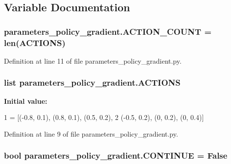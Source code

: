 \subsection{Variable Documentation}
\subsubsection[{\texorpdfstring{A\+C\+T\+I\+O\+N\+\_\+\+C\+O\+U\+NT}{ACTION_COUNT}}]{\setlength{\rightskip}{0pt plus 5cm}parameters\+\_\+policy\+\_\+gradient.\+A\+C\+T\+I\+O\+N\+\_\+\+C\+O\+U\+NT = len({\bf A\+C\+T\+I\+O\+NS})}\hypertarget{namespaceparameters__policy__gradient_a96a0f11e2c0420498ae8bec147f751e2}{}\label{namespaceparameters__policy__gradient_a96a0f11e2c0420498ae8bec147f751e2}


Definition at line 11 of file parameters\+\_\+policy\+\_\+gradient.\+py.

\subsubsection[{\texorpdfstring{A\+C\+T\+I\+O\+NS}{ACTIONS}}]{\setlength{\rightskip}{0pt plus 5cm}list parameters\+\_\+policy\+\_\+gradient.\+A\+C\+T\+I\+O\+NS}\hypertarget{namespaceparameters__policy__gradient_a14a6aa5c85bbb1f0a5eebce843788071}{}\label{namespaceparameters__policy__gradient_a14a6aa5c85bbb1f0a5eebce843788071}
{\bfseries Initial value\+:}
\begin{DoxyCode}
1 = [(-0.8, 0.1), (0.8, 0.1), (0.5, 0.2),
2            (-0.5, 0.2), (0, 0.2), (0, 0.4)]
\end{DoxyCode}


Definition at line 9 of file parameters\+\_\+policy\+\_\+gradient.\+py.

\subsubsection[{\texorpdfstring{C\+O\+N\+T\+I\+N\+UE}{CONTINUE}}]{\setlength{\rightskip}{0pt plus 5cm}bool parameters\+\_\+policy\+\_\+gradient.\+C\+O\+N\+T\+I\+N\+UE = False}\hypertarget{namespaceparameters__policy__gradient_a1dfc560f0fb66eabf7e4a49aec538e18}{}\label{namespaceparameters__policy__gradient_a1dfc560f0fb66eabf7e4a49aec538e18}


